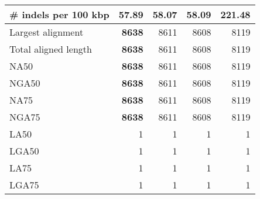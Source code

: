 \documentclass[12pt,a4paper]{article}
\begin{document}
\begin{table}[ht]
\begin{center}
\begin{tabular}{|l*{4}{|r}|}
\# indels per 100 kbp & {\bf 57.89} & 58.07 & 58.09 & 221.48 \\ \hline
Largest alignment & {\bf 8638} & 8611 & 8608 & 8119 \\ \hline
Total aligned length & {\bf 8638} & 8611 & 8608 & 8119 \\ \hline
NA50 & {\bf 8638} & 8611 & 8608 & 8119 \\ \hline
NGA50 & {\bf 8638} & 8611 & 8608 & 8119 \\ \hline
NA75 & {\bf 8638} & 8611 & 8608 & 8119 \\ \hline
NGA75 & {\bf 8638} & 8611 & 8608 & 8119 \\ \hline
LA50 & 1 & 1 & 1 & 1 \\ \hline
LGA50 & 1 & 1 & 1 & 1 \\ \hline
LA75 & 1 & 1 & 1 & 1 \\ \hline
LGA75 & 1 & 1 & 1 & 1 \\ \hline
\end{tabular}
\end{center}
\end{table}
\end{document}
